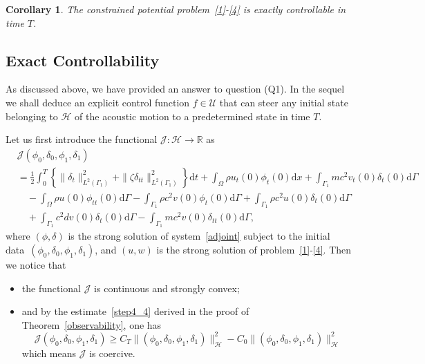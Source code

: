 \documentclass[10pt]{elsarticle}
\newtheorem{corollary}{Corollary}
\begin{document}
\begin{corollary}\label{control:exact}
The constrained potential problem~\eqref{1}-\eqref{4} is exactly controllable in time $T$.
\end{corollary}

\subsection{Exact Controllability}
\label{subsec:controllability}

As discussed above, we have provided an answer to question (Q1). 
In the sequel we shall deduce an explicit control function $f\in\mathcal{U}$ that can steer any initial state belonging to $\mathcal{H}$ of the acoustic motion to a predetermined state in time $T$. 

Let us first introduce the functional $\mathcal{J}:\mathcal{H}\rightarrow\mathbb{R}$ as
\begin{equation*}
\begin{split}
&\mathcal{J}(\phi_0, \delta_0, \phi_1, \delta_1) \\
&= \frac{1}{2}\int_{0}^{T}\left\{ \|\delta_t\|^2_{L^2(\Gamma_1)}+\|\zeta\delta_{tt}\|^2_{L^2(\Gamma_1)}\right\}\mathrm{d}t + \int_{\Omega}\rho u_{t}(0)\phi_t(0)\mathrm{d}x + \int_{\Gamma_1}m c^2 v_{t}(0)\delta_t(0)\mathrm{d}\Gamma\\
&\quad - \int_{\Omega}\rho u(0)\phi_{tt}(0)\mathrm{d}\Gamma - \int_{\Gamma_1}\rho c^2 v(0)\phi_t(0)\mathrm{d}\Gamma + \int_{\Gamma_1}\rho c^2 u(0)\delta_t(0)\mathrm{d}\Gamma\\
&\quad + \int_{\Gamma_1}c^2 d v(0)\delta_t(0)\mathrm{d}\Gamma - \int_{\Gamma_1}m c^2 v(0)\delta_{tt}(0)\mathrm{d}\Gamma,
\end{split}
\end{equation*}
where $({\phi}, {\delta})$ is the strong solution of system~\eqref{adjoint} subject to the initial data~$({\phi}_0, {\delta}_0, {\phi}_1, {\delta}_1)$, and $({u}, {w})$ is the strong solution of problem~\eqref{1}-\eqref{4}. Then we notice that
\begin{itemize}
\item the functional $\mathcal{J}$ is continuous and strongly convex;
\item and by the estimate~\eqref{step4_4} derived in the proof of Theorem~\ref{observability}, one has
\[
\mathcal{J}(\phi_0, \delta_0, \phi_1, \delta_1) \geqslant C_{T}\|(\phi_0, \delta_0, \phi_1, \delta_1)\|^2_{\mathcal{H}} - C_0\|(\phi_0, \delta_0, \phi_1, \delta_1)\|^2_{\mathcal{H}}
\]
which means $\mathcal{J}$ is coercive. 
\end{itemize}
\end{document}
